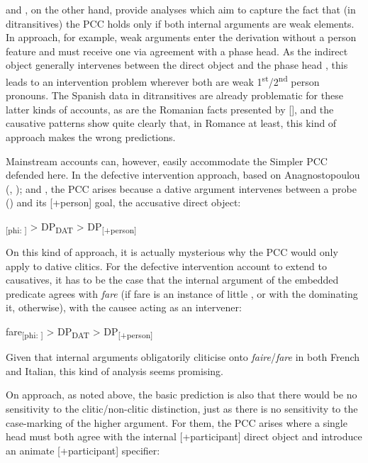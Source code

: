 \documentclass[output=paper,colorlinks,citecolor=brown,nonflat]{./langscibook}
\begin{document}
\citet{Bianchi2006} and \citet{Stegovec2017}, on the other hand, provide analyses which aim to capture the fact that (in ditransitives) the PCC holds only if both internal arguments are weak elements. In  approach, for example, weak arguments enter the derivation without a person feature and must receive one via agreement with a phase head. As the indirect object generally intervenes between the direct object and the phase head \liv , this leads to an intervention problem wherever both are weak 1\textsuperscript{st}/2\textsuperscript{nd} person pronouns. The Spanish data in ditransitives are already problematic for these latter kinds of accounts, as are the Romanian facts presented by  [], and the causative patterns show quite clearly that, in Romance at least, this kind of approach makes the wrong predictions. 

Mainstream accounts can, however, easily accommodate the Simpler PCC defended here. In the defective intervention approach, based on Anagnostopoulou (\citeyear{Anagnostopoulou2003}, \citeyear{Anagnostopoulou2005}); \citet{BéjarRezac2003} and \citet{Rezac2008}, the PCC arises because a dative argument intervenes between a probe (\liv ) and its [+person] goal, the accusative direct object:

\ea%
    \label{ex:sheehan:37}
    \liv \textsubscript{[phi: ]}    > DP\textsubscript{DAT} >     DP\textsubscript{[+person]}
\z

On this kind of approach, it is actually mysterious why the PCC would only apply to dative clitics. For the defective intervention account to extend to causatives, it has to be the case that the internal argument of the embedded predicate agrees with \textit{fare} (if fare is an instance of little \liv , or with the \liv dominating it, otherwise), with the causee acting as an intervener:

\ea%
    \label{ex:sheehan:38}
    fare\textsubscript{[phi: ]}   >  DP\textsubscript{DAT} >   DP\textsubscript{[+person]}
\z

Given that internal arguments obligatorily cliticise onto \textit{faire}/\textit{fare} in both French and Italian, this kind of analysis seems promising. 

On  approach, as noted above, the basic prediction is also that there would be no sensitivity to the clitic/non-clitic distinction, just as there is no sensitivity to the case-marking of the higher argument. For them, the PCC arises where a single head must both agree with the internal [+participant] direct object and introduce an animate [+participant] specifier:
\end{document}
